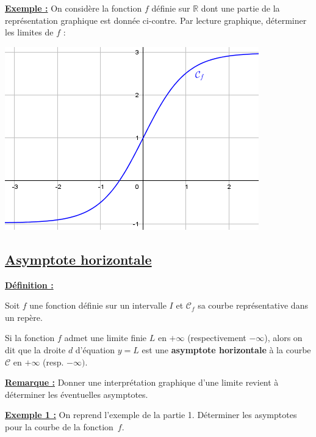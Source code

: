 \documentclass[11pt,a4paper]{article}
\newenvironment{definition}{
\vspace{-0.25cm}
\blue
\begin{framed}
\textbf{\underline{Définition :}} \par
\medskip
}
{
\end{framed}
\vspace{-0.25cm}
}
\begin{document}
\begin{minipage}{0.6\linewidth}
\textbf{\underline{Exemple :}} On considère la fonction $f$ définie sur
$\mathbb{R}$ dont une partie de la représentation graphique
est donnée ci-contre. Par lecture graphique, déterminer les limites de $f$ :

\vspace{4cm}

\end{minipage}
\hfill
\begin{minipage}{0.35\linewidth}
\includegraphics[scale=0.5]{media/media/image3.png}
\end{minipage}

\subsection{\textcolor{vert}{\underline{Asymptote horizontale}}}

\begin{definition}
Soit $f$ une fonction définie sur un intervalle $I$ et
$\mathscr{C}_f$ sa courbe représentative dans un repère. \par
Si la fonction $f$ admet une limite finie $L$ en $+ \infty$ (respectivement $- \infty$), alors on dit que la droite $d$ d'équation $y = L$ est une \textbf{asymptote horizontale} à la courbe $\mathcal{C}$ en $+ \infty$ (resp. $- \infty)$.
\end{definition}

\bigskip

\textbf{\underline{Remarque :}} Donner une interprétation graphique d'une limite
revient à déterminer les éventuelles asymptotes.

\bigskip

\textbf{\underline{Exemple 1 :}} On reprend l'exemple de la partie 1. Déterminer les asymptotes pour la courbe de la fonction~$f$.
\end{document}
